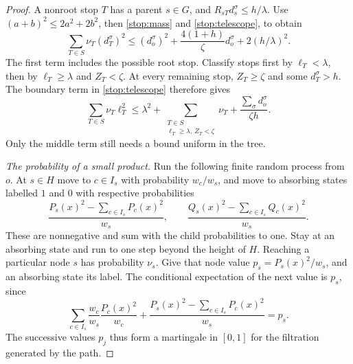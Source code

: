\begin{proof}
A nonroot stop $T$ has a parent $s\in G$, and
$R_{sT}d_s^\sigma\le h/\lambda$.  Use
$(a+b)^2\le2a^2+2b^2$, then \eqref{stop:mass} and
\eqref{stop:telescope}, to obtain
\begin{equation}\label{stop:squares}
 \sum_{T\in S}\nu_T(d_T^\sigma)^2
 \le(d_o^\sigma)^2+\frac{4(1+h)}{\zeta}d_o^\sigma
                         +2(h/\lambda)^2.
\end{equation}
The first term includes the possible root stop.  Classify stops first
by $\ell_T<\lambda$, then by $\ell_T\ge\lambda$ and $Z_T<\zeta$.
At every remaining stop, $Z_T\ge\zeta$ and some $d_T^\sigma>h$.
The boundary term in \eqref{stop:telescope} therefore gives
\begin{equation}\label{stop:minima}
 \sum_{T\in S}\nu_T\ell_T^2
 \le\lambda^2+
 \sum_{\substack{T\in S\\\ell_T\ge\lambda,\ Z_T<\zeta}}\nu_T
 +\frac{\sum_\sigma d_o^\sigma}{\zeta h}.
\end{equation}
Only the middle term still needs a bound uniform in the tree.

\medskip
\noindent\emph{The probability of a small product.}
Run the following finite random process from $o$.  At $s\in H$ move to
$c\in I_s$ with probability $w_c/w_s$, and move to absorbing states
labelled $1$ and $0$ with respective probabilities
\[
 \frac{P_s(x)^2-\sum_{c\in I_s}P_c(x)^2}{w_s},\qquad
 \frac{Q_s(x)^2-\sum_{c\in I_s}Q_c(x)^2}{w_s}.
\]
These are nonnegative and sum with the child probabilities to one.
Stay at an absorbing state and run to one step beyond the height of
$H$.  Reaching a particular node $s$ has probability $\nu_s$.
Give that node value $p_s=P_s(x)^2/w_s$, and an absorbing state its
label.  The conditional expectation of the next value is $p_s$, since
\[
 \sum_{c\in I_s}\frac{w_c}{w_s}\frac{P_c(x)^2}{w_c}
 +\frac{P_s(x)^2-\sum_{c\in I_s}P_c(x)^2}{w_s}=p_s.
\]
The successive values $p_j$ thus form a martingale in $[0,1]$ for the
filtration generated by the path.


\end{proof}
